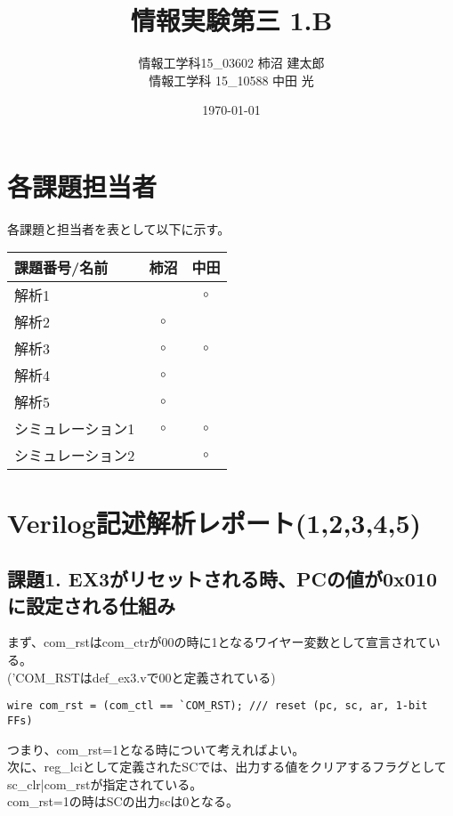 \documentclass{jsarticle}
\title{情報実験第三 1.B}
\author{情報工学科15\_03602 柿沼 建太郎 \\ 情報工学科 15\_10588 中田 光}
\date{\today}
\begin{document}
\maketitle

\section*{各課題担当者}
各課題と担当者を表として以下に示す。
\begin{table}[h]
\begin{tabular}{|l|c|c|} \hline
課題番号/名前 & 柿沼 & 中田 \\ \hline \hline
解析1 &  & $\circ$ \\ \hline
解析2 & $\circ$ & \\ \hline
解析3 & $\circ$ & $\circ$ \\ \hline
解析4 & $\circ$ & \\ \hline
解析5 & $\circ$ & \\ \hline
シミュレーション1 & $\circ$ & $\circ$ \\ \hline
シミュレーション2 &  & $\circ$  \\ \hline
\end{tabular}
\end{table}

\section*{Verilog記述解析レポート(1,2,3,4,5)}

\subsection*{課題1. EX3がリセットされる時、PCの値が0x010に設定される仕組み}

まず、com\_rstはcom\_ctrが00の時に1となるワイヤー変数として宣言されている。 \\
('COM\_RSTはdef\_ex3.vで00と定義されている)

\begin{lstlisting}[caption=cpu\_ex3.v 33行目]
wire com_rst = (com_ctl == `COM_RST); /// reset (pc, sc, ar, 1-bit FFs)
\end{lstlisting}

つまり、com\_rst=1となる時について考えればよい。\\
次に、reg\_lciとして定義されたSCでは、出力する値をクリアするフラグとしてsc\_clr|com\_rstが指定されている。 \\
com\_rst=1の時はSCの出力scは0となる。
\end{document}
